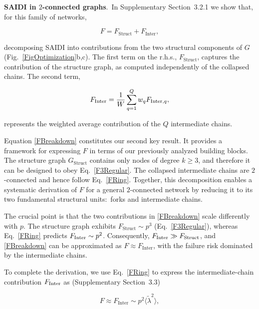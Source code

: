 \documentclass[oneside, a4paper, onecolumn, 11pt]{article}
\newcommand{\av}[1]{\langle #1 \rangle}
\begin{document}
\begin{refsection}
\vspace{3mm}
\textbf{\color{blue} SAIDI in $2$-connected graphs}.\ 
In Supplementary Section~3.2.1 we show that, for this family of networks,

\begin{equation}
F = F_{\text{Struct}} + F_{{\text{Inter}}},
\label{FBreakdown}
\end{equation}

decomposing SAIDI into contributions from the two structural components of $G$ (Fig.\ \ref{FigOptimization}b,c). The first term on the r.h.s., $F_{\text{Struct}}$, captures the contribution of the structure graph, as computed independently of the collapsed chains. The second term,

\begin{equation}
F_{{\rm Inter}} = \dfrac{1}{W} \sum_{q = 1}^Q w_q F_{{\rm Inter},q},
\label{FInter}
\end{equation}

represents the weighted average contribution of the $Q$ intermediate chains.

Equation \eqref{FBreakdown} constitutes our second key result. It provides a framework for expressing $F$ in terms of our previously analyzed building blocks. The structure graph $G_{\text{Struct}}$ contains only nodes of degree $k \ge 3$, and therefore it can be designed to obey Eq.\ \eqref{F3Regular}. The collapsed intermediate chains are $2$-connected and hence follow Eq.\ \eqref{FRing}. Together, this decomposition enables a systematic derivation of $F$ for a general $2$-connected network by reducing it to its two fundamental structural units:\ forks and intermediate chains.

The crucial point is that the two contributions in \eqref{FBreakdown} scale differently with $p$. The structure graph exhibits $F_{\text{Struct}} \sim p^3$ (Eq.\ \eqref{F3Regular}), whereas Eq.\ \eqref{FRing} predicts $F_{{\rm Inter}} \sim p^2$. Consequently, $F_{{\rm Inter}} \gg F_{\text{Struct}}$, and \eqref{FBreakdown} can be approximated as $F \approx F_{\text{Inter}}$, with the failure risk dominated by the intermediate chains.

To complete the derivation, we use Eq.\ \eqref{FRing} to express the intermediate-chain contribution $F_{{\rm Inter}}$ as (Supplementary Section~3.3)

\begin{equation}
\label{InterRisk}
F \approx F_{\text{Inter}} \sim p^2 \av {\tilde \lambda^2},
\end{equation}


\end{refsection}
\end{document}
